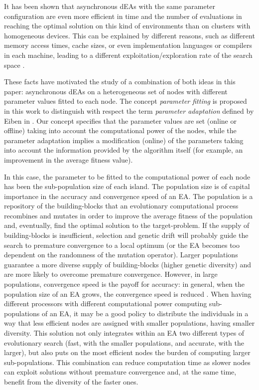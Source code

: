 \documentclass[final,1p,times]{elsarticle}
\begin{document}
It  has  been shown that
\cite{HETEROGENEOUSHARD} asynchronous dEAs with the same parameter
configuration are even 
more efficient in time and the number of evaluations in reaching the optimal solution on this kind of environments  than on clusters with
homogeneous devices. This can be explained by different reasons, such
as different memory access times, cache sizes, 
or even implementation
languages or compilers in each machine, leading to a different
exploitation/exploration rate of the search space \cite{HETEROGENEOUSHARD}. 


These facts have motivated the study of a combination of both ideas in
this paper: asynchronous dEAs on a heterogeneous set of nodes with different
parameter values fitted to each node. The concept {\em parameter fitting} is proposed in this work to distinguish with respect the term {\em parameter adaptation} defined by Eiben in \cite{Eiben05Shared}. Our concept specifies that the parameter values are set (online or offline) taking into account the computational power of the nodes, while the parameter adaptation implies a modification (online) of the parameters taking into account the information provided by the algorithm itself (for example, an improvement in the average fitness value).

In this case, the parameter to
be fitted to the computational power of each node has been the
sub-population size of each island. 
The population size is of capital importance in the accuracy and
convergence speed of an EA. The population is a repository of the
building-blocks that an evolutionary computational process recombines
and mutates in order to improve the average fitness of the population
and, eventually, find the optimal solution to the target-problem. If
the supply of building-blocks is insufficient, selection and genetic
drift will probably guide the search to premature convergence to a
local optimum (or the EA becomes too dependent on the randomness of
the mutation operator). Larger populations guarantee a more diverse
supply of building-blocks (higher genetic diversity) and are more
likely to overcome premature convergence. However, in large
populations, convergence speed is the payoff for accuracy: in general,
when the population size of an EA grows, the convergence speed is
reduced \cite{Cantu02Multiple}. When having different processors with different computational
power computing sub-populations of an EA, it may be a good policy to
distribute the individuals in a way that less efficient nodes are
assigned with smaller populations, having smaller diversity. 
This solution not only integrates
within an EA two different types of evolutionary search (fast, with
the smaller populations, and accurate, with the larger), but also puts
on the most efficient nodes the burden of computing larger
sub-populations. This combination can reduce computation time
as slower nodes can exploit solutions without premature convergence and,
 at the same time, benefit from the diversity of the faster ones. 
\end{document}
